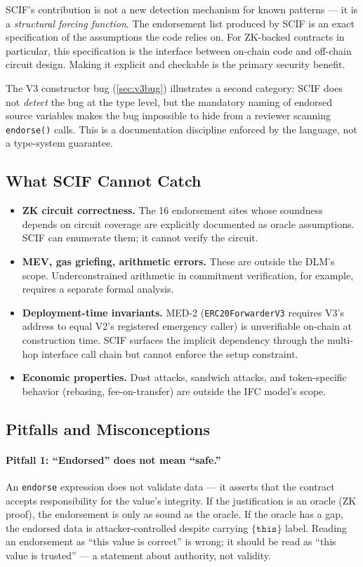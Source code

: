 \documentclass[11pt,a4paper]{article}
\begin{document}
SCIF's contribution is not a new detection mechanism for known patterns --- it
is a \emph{structural forcing function}. The endorsement list produced by SCIF
is an exact specification of the assumptions the code relies on. For ZK-backed
contracts in particular, this specification is the interface between on-chain
code and off-chain circuit design. Making it explicit and checkable is the
primary security benefit.

The V3 constructor bug (\cref{sec:v3bug}) illustrates a second category: SCIF
does not \emph{detect} the bug at the type level, but the mandatory naming of
endorsed source variables makes the bug impossible to hide from a reviewer
scanning \texttt{endorse()} calls. This is a documentation discipline enforced
by the language, not a type-system guarantee.

\subsection{What SCIF Cannot Catch}

\begin{itemize}
  \item \textbf{ZK circuit correctness.} The 16 endorsement sites whose
    soundness depends on circuit coverage are explicitly documented as oracle
    assumptions. SCIF can enumerate them; it cannot verify the circuit.
  \item \textbf{MEV, gas griefing, arithmetic errors.} These are outside the
    DLM's scope. Underconstrained arithmetic in commitment verification, for
    example, requires a separate formal analysis.
  \item \textbf{Deployment-time invariants.} MED-2 (\texttt{ERC20ForwarderV3}
    requires V3's address to equal V2's registered emergency caller) is
    unverifiable on-chain at construction time. SCIF surfaces the implicit
    dependency through the multi-hop interface call chain but cannot enforce
    the setup constraint.
  \item \textbf{Economic properties.} Dust attacks, sandwich attacks, and
    token-specific behavior (rebasing, fee-on-transfer) are outside the IFC
    model's scope.
\end{itemize}

\subsection{Pitfalls and Misconceptions}
\label{sec:pitfalls}

\paragraph{Pitfall 1: ``Endorsed'' does not mean ``safe.''}
An \texttt{endorse} expression does not validate data --- it asserts that the
contract accepts responsibility for the value's integrity. If the justification
is an oracle (ZK proof), the endorsement is only as sound as the oracle. If the
oracle has a gap, the endorsed data is attacker-controlled despite carrying
$\{\texttt{this}\}$ label. Reading an endorsement as ``this value is correct''
is wrong; it should be read as ``this value is trusted'' --- a statement about
authority, not validity.
\end{document}
